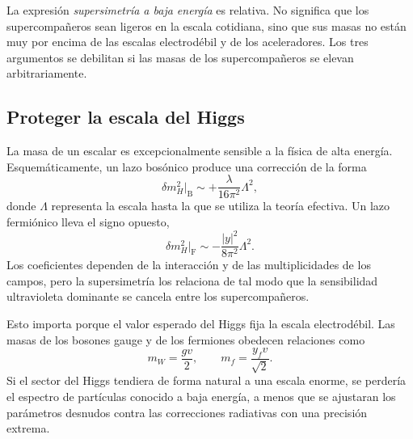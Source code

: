 \begin{classroomqa}
\end{classroomqa}

La expresión \emph{supersimetría a baja energía} es relativa. No significa que los supercompañeros sean ligeros en la escala cotidiana, sino que sus masas no están muy por encima de las escalas electrodébil y de los aceleradores. Los tres argumentos se debilitan si las masas de los supercompañeros se elevan arbitrariamente.

\subsection{Proteger la escala del Higgs}

La masa de un escalar es excepcionalmente sensible a la física de alta energía. Esquemáticamente, un lazo bosónico produce una corrección de la forma
\begin{equation}
\delta m_H^2\big|_{\mathrm B}
\sim +\frac{\lambda}{16\pi^2}\Lambda^2,
\end{equation}
donde \(\Lambda\) representa la escala hasta la que se utiliza la teoría efectiva. Un lazo fermiónico lleva el signo opuesto,
\begin{equation}
\delta m_H^2\big|_{\mathrm F}
\sim -\frac{|y|^2}{8\pi^2}\Lambda^2.
\end{equation}
Los coeficientes dependen de la interacción y de las multiplicidades de los campos, pero la supersimetría los relaciona de tal modo que la sensibilidad ultravioleta dominante se cancela entre los supercompañeros.

Esto importa porque el valor esperado del Higgs fija la escala electrodébil. Las masas de los bosones gauge y de los fermiones obedecen relaciones como
\begin{equation}
m_W=\frac{gv}{2},
\qquad
m_f=\frac{y_fv}{\sqrt2}.
\end{equation}
Si el sector del Higgs tendiera de forma natural a una escala enorme, se perdería el espectro de partículas conocido a baja energía, a menos que se ajustaran los parámetros desnudos contra las correcciones radiativas con una precisión extrema.

